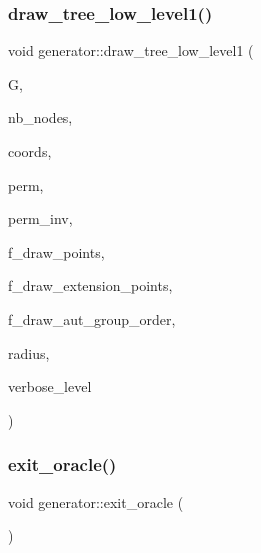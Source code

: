 \subsubsection{\texorpdfstring{draw\+\_\+tree\+\_\+low\+\_\+level1()}{draw\_tree\_low\_level1()}}
{\footnotesize\ttfamily void generator\+::draw\+\_\+tree\+\_\+low\+\_\+level1 (\begin{DoxyParamCaption}\item[{\mbox{\hyperlink{classmp__graphics}{mp\+\_\+graphics}} \&}]{G,  }\item[{\mbox{\hyperlink{galois_8h_a09fddde158a3a20bd2dcadb609de11dc}{I\+NT}}}]{nb\+\_\+nodes,  }\item[{\mbox{\hyperlink{galois_8h_a09fddde158a3a20bd2dcadb609de11dc}{I\+NT}} $\ast$}]{coords,  }\item[{\mbox{\hyperlink{galois_8h_a09fddde158a3a20bd2dcadb609de11dc}{I\+NT}} $\ast$}]{perm,  }\item[{\mbox{\hyperlink{galois_8h_a09fddde158a3a20bd2dcadb609de11dc}{I\+NT}} $\ast$}]{perm\+\_\+inv,  }\item[{\mbox{\hyperlink{galois_8h_a09fddde158a3a20bd2dcadb609de11dc}{I\+NT}}}]{f\+\_\+draw\+\_\+points,  }\item[{\mbox{\hyperlink{galois_8h_a09fddde158a3a20bd2dcadb609de11dc}{I\+NT}}}]{f\+\_\+draw\+\_\+extension\+\_\+points,  }\item[{\mbox{\hyperlink{galois_8h_a09fddde158a3a20bd2dcadb609de11dc}{I\+NT}}}]{f\+\_\+draw\+\_\+aut\+\_\+group\+\_\+order,  }\item[{\mbox{\hyperlink{galois_8h_a09fddde158a3a20bd2dcadb609de11dc}{I\+NT}}}]{radius,  }\item[{\mbox{\hyperlink{galois_8h_a09fddde158a3a20bd2dcadb609de11dc}{I\+NT}}}]{verbose\+\_\+level }\end{DoxyParamCaption})}

\mbox{\label{classgenerator_a1e4678cc7b022132252a1fe35556319b}} 
\subsubsection{\texorpdfstring{exit\+\_\+oracle()}{exit\_oracle()}}
{\footnotesize\ttfamily void generator\+::exit\+\_\+oracle (\begin{DoxyParamCaption}{ }\end{DoxyParamCaption})}

